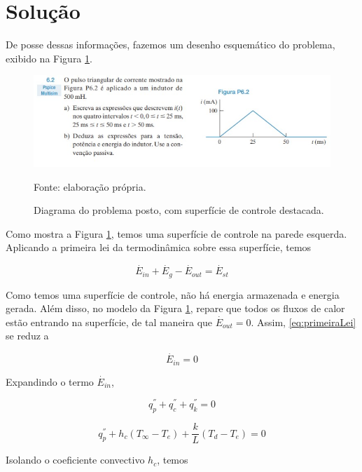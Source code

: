 \documentclass[12pt]{scrartcl}
\begin{document}
\section{Solução}

De posse dessas informações, fazemos um desenho esquemático do problema, exibido na
Figura \ref{fig:problemaParede}.

\begin{figure}[h!]
    \caption{Diagrama do problema posto, com superfície de controle destacada.}
    \label{fig:problemaParede}
    \centering
    \includegraphics[scale=1.0]{problema.jpg}
    \par{Fonte: elaboração própria.}
\end{figure}

Como mostra a Figura \ref{fig:problemaParede}, temos uma superfície de controle na
parede esquerda. Aplicando a primeira lei da termodinâmica sobre essa superfície, temos

\begin{equation}\label{eq:primeiraLei}
    \overset{\cdot}{E}_{in} + \overset{\cdot}{E}_{g} - \overset{\cdot}{E}_{out} = \overset{\cdot}{E}_{st}
\end{equation}

Como temos uma superfície de controle, não há energia armazenada e energia gerada. Além disso, no modelo
da Figura \ref*{fig:problemaParede}, repare que todos os fluxos de calor estão entrando na superfície, de tal
maneira que $\overset{\cdot}{E}_{out} = 0$. Assim, \eqref{eq:primeiraLei} se reduz a

\begin{equation}\label{eq:primeiraLeiReduzida}
    \overset{\cdot}{E}_{in} = 0
\end{equation}

Expandindo o termo $\overset{\cdot}{E}_{in}$,

\[ q_{p}^{''} + q_{c}^{''} + q_{k}^{''} = 0 \]

\[ q_{p}^{''} + h_c\left(T_{\infty}-T_e\right) + \frac{k}{L}\left(T_d-T_e\right) = 0 \]

Isolando o coeficiente convectivo $h_c$, temos
\end{document}
